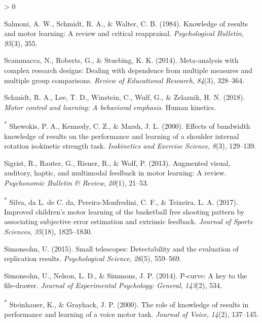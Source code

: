 \documentclass[
  english,
  man, donotrepeattitle,floatsintext]{apa7}
\newlength{\cslhangindent}
\newenvironment{CSLReferences}[2] %
 {%
  \setlength{\parindent}{0pt}
  \ifodd #1 \everypar{\setlength{\hangindent}{\cslhangindent}}\ignorespaces\fi
  \ifnum #2 > 0
  \setlength{\parskip}{#2\baselineskip}
  \fi
 }%
 {}
\begin{document}
\begin{CSLReferences}{1}{0}
\leavevmode\hypertarget{ref-Salmoni1984}{}%
Salmoni, A. W., Schmidt, R. A., \& Walter, C. B. (1984). Knowledge of results and motor learning: A review and critical reappraisal. \emph{Psychological Bulletin}, \emph{95}(3), 355.

\leavevmode\hypertarget{ref-Scammacca2014}{}%
Scammacca, N., Roberts, G., \& Stuebing, K. K. (2014). Meta-analysis with complex research designs: Dealing with dependence from multiple measures and multiple group comparisons. \emph{Review of Educational Research}, \emph{84}(3), 328--364.

\leavevmode\hypertarget{ref-Schmidt2018}{}%
Schmidt, R. A., Lee, T. D., Winstein, C., Wulf, G., \& Zelaznik, H. N. (2018). \emph{Motor control and learning: A behavioral emphasis}. Human kinetics.

\leavevmode\hypertarget{ref-Shewokis2000}{}%
\textsuperscript{*} Shewokis, P. A., Kennedy, C. Z., \& Marsh, J. L. (2000). Effects of bandwidth knowledge of results on the performance and learning of a shoulder internal rotation isokinetic strength task. \emph{Isokinetics and Exercise Science}, \emph{8}(3), 129--139.

\leavevmode\hypertarget{ref-Sigrist2013}{}%
Sigrist, R., Rauter, G., Riener, R., \& Wolf, P. (2013). Augmented visual, auditory, haptic, and multimodal feedback in motor learning: A review. \emph{Psychonomic Bulletin \& Review}, \emph{20}(1), 21--53.

\leavevmode\hypertarget{ref-Silva2017}{}%
\textsuperscript{*} Silva, da L. de C. da, Pereira-Monfredini, C. F., \& Teixeira, L. A. (2017). Improved children's motor learning of the basketball free shooting pattern by associating subjective error estimation and extrinsic feedback. \emph{Journal of Sports Sciences}, \emph{35}(18), 1825--1830.

\leavevmode\hypertarget{ref-Simonsohn2015}{}%
Simonsohn, U. (2015). Small telescopes: Detectability and the evaluation of replication results. \emph{Psychological Science}, \emph{26}(5), 559--569.

\leavevmode\hypertarget{ref-Simonsohn2014}{}%
Simonsohn, U., Nelson, L. D., \& Simmons, J. P. (2014). P-curve: A key to the file-drawer. \emph{Journal of Experimental Psychology: General}, \emph{143}(2), 534.

\leavevmode\hypertarget{ref-Steinhauer2000}{}%
\textsuperscript{*} Steinhauer, K., \& Grayhack, J. P. (2000). The role of knowledge of results in performance and learning of a voice motor task. \emph{Journal of Voice}, \emph{14}(2), 137--145.


\end{CSLReferences}
\end{document}
